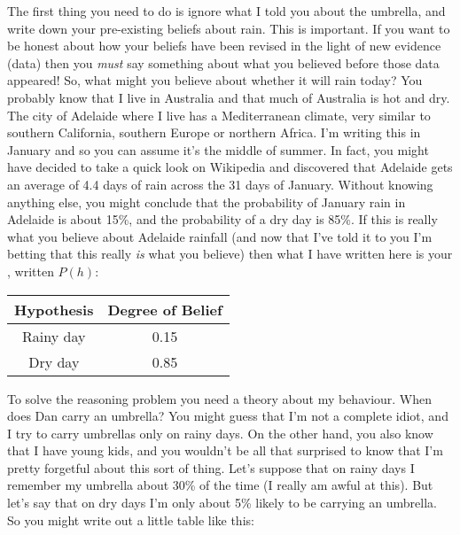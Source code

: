 
The first thing you need to do is ignore what I told you about the umbrella, and write down your pre-existing beliefs about rain. This is important. If you want to be honest about how your beliefs have been revised in the light of new evidence (data) then you {\it must} say something about what you believed before those data appeared! So, what might you believe about whether it will rain today? You probably know that I live in Australia and that much of Australia is hot and dry. The city of Adelaide where I live has a Mediterranean climate, very similar to southern California, southern Europe or northern Africa. I'm writing this in January and so you can assume it's the middle of summer. In fact, you might have decided to take a quick look on Wikipedia and discovered that Adelaide gets an average of 4.4 days of rain across the 31 days of January. Without knowing anything else, you might conclude that the probability of January rain in Adelaide is about 15\%, and the probability of a dry day is 85\%. If this is really what you believe about Adelaide rainfall (and now that I've told it to you I'm betting that this really {\it is} what you believe) then what I have written here is your , written $P(h)$:

\begin{center}
\begin{tabular}{c|c}
Hypothesis & Degree of Belief \\ \hline
Rainy day & 0.15 \\
Dry day & 0.85
\end{tabular}
\end{center}


To solve the reasoning problem you need a theory about my behaviour. When does Dan carry an umbrella? You might guess that I'm not a complete idiot, and I try to carry umbrellas only on rainy days. On the other hand, you also know that I have young kids, and you wouldn't be all that surprised to know that I'm pretty forgetful about this sort of thing. Let's suppose that on rainy days I remember my umbrella about 30\% of the time (I really am awful at this). But let's say that on dry days I'm only about 5\% likely to be carrying an umbrella. So you might write out a little table like this:


